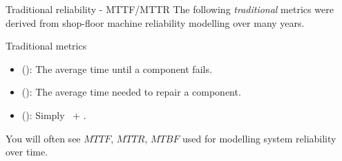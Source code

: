 \begin{slide}{Traditional reliability - MTTF/MTTR}
  The following \emph{traditional} metrics were derived from
  shop-floor machine reliability modelling over many years.
  \begin{block}{Traditional metrics}
    \begin{itemize}\firmlist
    \item {} (\blue{\MTTF}): The average time until a component fails.
    \item {} (\blue{\MTTR}): The average time needed to repair a component.
    \item {} (\blue{\MTBF}): Simply \MTTF\ + \MTTR.
    \end{itemize}
  \end{block}
You will often see $MTTF$, $MTTR$, $MTBF$ used for modelling
system reliability over time.  
\end{slide}


